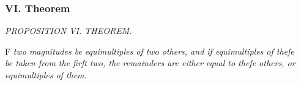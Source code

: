 \documentclass[12pt,preview]{standalone}
\begin{document}
\subsubsection{VI. Theorem}

\begin{minipage}{\textwidth}

    \begin{center}
        \textit{PROPOSITION VI. THEOREM.}\label{book5pr6} \\
    \end{center}

    \hfill

    \begin{center}
        \raggedright \lettrine[lines=4, loversize=1, nindent=0pt]{}{}F \textit{two magnitudes be equimultiples of two others, and if equimultiples of theſe\\ be taken from the firſt two, the remainders are either equal to theſe others, or\\ equimultiples of them}.
    \end{center}

    \hfill

    \hfill


\end{minipage}
\end{document}
